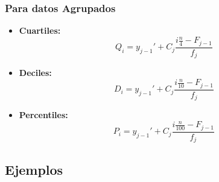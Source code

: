\subsubsection{Para datos Agrupados}
\begin{itemize}
\item \textbf{Cuartiles:}
$$Q_i=y_{j-1}'+C_j\dfrac{i\frac{n}{4}-F_{j-1}}{f_j}$$
\item \textbf{Deciles:}
$$D_i=y_{j-1}'+C_j\dfrac{i\frac{n}{10}-F_{j-1}}{f_j}$$
\item \textbf{Percentiles:}
$$P_i=y_{j-1}'+C_j\dfrac{i\frac{n}{100}-F_{j-1}}{f_j}$$
\end{itemize}
\subsection{Ejemplos}
